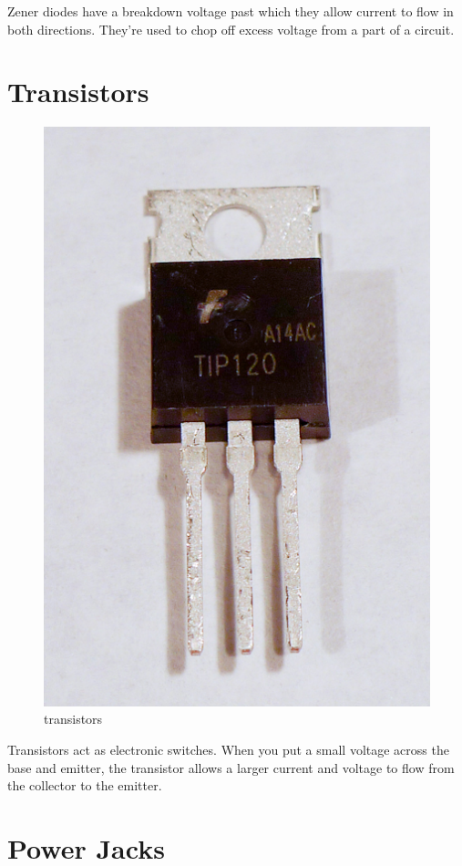 Zener diodes have a breakdown voltage past which they allow current to flow in both directions. They're used to chop off excess voltage from a part of a circuit.

\section{Transistors}

\begin{figure}[!htb]
     \centering
     \includegraphics[scale=0.3]{img/components/transistors.jpg}
     \caption{transistors}
     \label{transistors}
\end{figure}

Transistors act as electronic switches. When you put a small voltage across the base and emitter, the transistor allows a larger current and voltage to flow from the collector to the emitter.

\section{Power Jacks}


